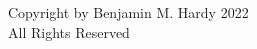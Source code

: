 
\chapter*{}\label{COPYRIGHT}
\vspace{7mm}

\begin{center}

{\textcopyright} Copyright by Benjamin M. Hardy 2022
\vspace{7mm}
\\
All Rights Reserved
\vspace{7mm}


    
\end{center}